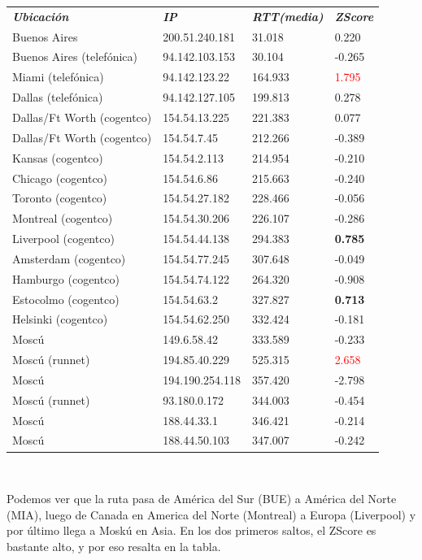 \begin{tabular}{llll}
	\textit{\textbf{Ubicaci\'on}}	&	\textit{\textbf{IP}}	&	\textit{\textbf{RTT(media)}}	&	\textit{\textbf{ZScore}}	\\
	Buenos Aires	&	200.51.240.181	&	31.018	&	0.220	\\
	Buenos Aires (telef\'onica)	&	94.142.103.153	&	30.104	&	-0.265	\\
	Miami (telef\'onica)		&	94.142.123.22	&	164.933	&	\textcolor{red}{1.795}	\\
	Dallas (telef\'onica)		&	94.142.127.105	&	199.813	&	0.278	\\
	Dallas/Ft Worth (cogentco)	&	154.54.13.225	&	221.383	&	0.077	\\
	Dallas/Ft Worth (cogentco)	&	154.54.7.45	&	212.266	&	-0.389	\\
	Kansas (cogentco)		&	154.54.2.113	&	214.954	&	-0.210	\\
	Chicago (cogentco)		&	154.54.6.86	&	215.663	&	-0.240	\\
	Toronto (cogentco)		&	154.54.27.182	&	228.466	&	-0.056	\\
	Montreal (cogentco)	&	154.54.30.206	&	226.107	&	-0.286	\\
	Liverpool (cogentco)	&	154.54.44.138	&	294.383	&	\textbf{0.785}	\\
	Amsterdam (cogentco)	&	154.54.77.245	&	307.648	&	-0.049	\\
	Hamburgo (cogentco)	&	154.54.74.122	&	264.320	&	-0.908	\\
	Estocolmo (cogentco)	&	154.54.63.2	&	327.827	&	\textbf{0.713}	\\
	Helsinki (cogentco)		&	154.54.62.250	&	332.424	&	-0.181	\\
	Mosc\'u			&	149.6.58.42	&	333.589	&	-0.233	\\
	Mosc\'u (runnet)		&	194.85.40.229	&	525.315	&	\textcolor{red}{2.658}	\\
	Mosc\'u 			&	194.190.254.118	&	357.420	&	-2.798	\\
	Mosc\'u (runnet)		&	93.180.0.172	&	344.003	&	-0.454	\\
	Mosc\'u			&	188.44.33.1	&	346.421	&	-0.214 	\\
	Mosc\'u			&	188.44.50.103	&	347.007	&	-0.242	\\

\end{tabular}

~

Podemos ver que la ruta pasa de Am\'erica del Sur (BUE) a Am\'erica del Norte (MIA), luego de Canada en America del Norte (Montreal) a Europa (Liverpool) y por \'ultimo llega a Mosk\'u en Asia. En los dos primeros saltos, el ZScore es bastante alto, y por eso resalta en la tabla. 

